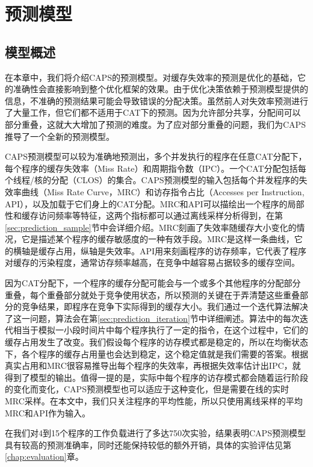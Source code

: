 
\chapter{预测模型} \label{chap:prediction}
\section{模型概述}
在本章中，我们将介绍CAPS的预测模型。对缓存失效率的预测是优化的基础，它的准确性会直接影响到整个优化框架的效果。由于优化决策依赖于预测模型提供的信息，不准确的预测结果可能会导致错误的分配决策。虽然前人对失效率预测进行了大量工作，但它们都不适用于CAT下的预测。因为允许部分共享，分配间可以部分重叠，这就大大增加了预测的难度。为了应对部分重叠的问题，我们为CAPS推导了一个全新的预测模型。

CAPS预测模型可以较为准确地预测出，多个并发执行的程序在任意CAT分配下，每个程序的缓存失效率（Miss Rate）和周期指令数（IPC）。一个CAT分配包括每个线程/核的分配（CLOS）的集合。CAPS预测模型的输入包括每个并发程序的失效率曲线（Miss Rate Curve，MRC）和访存指令占比（Accesses per Instruction, API），以及加载于它们身上的CAT分配。MRC和API可以描绘出一个程序的局部性和缓存访问频率等特征，这两个指标都可以通过离线采样分析得到，在第\ref{sec:prediction_sample}节中会详细介绍。MRC刻画了失效率随缓存大小变化的情况，它是描述某个程序的缓存敏感度的一种有效手段。MRC是这样一条曲线，它的横轴是缓存占用，纵轴是失效率。API用来刻画程序的访存频率，它代表了程序对缓存的污染程度，通常访存频率越高，在竞争中越容易占据较多的缓存空间。

因为CAT分配下，一个程序的缓存分配可能会与一个或多个其他程序的分配部分重叠，每个重叠部分就处于竞争使用状态，所以预测的关键在于弄清楚这些重叠部分的竞争结果，即程序在竞争下实际得到的缓存大小。我们通过一个迭代算法解决了这一问题，算法会在第\ref{sec:prediction_iteration}节中详细阐述。算法中的每次迭代相当于模拟一小段时间片中每个程序执行了一定的指令，在这个过程中，它们的缓存占用发生了改变。我们假设每个程序的访存模式都是稳定的，所以在均衡状态下，各个程序的缓存占用量也会达到稳定，这个稳定值就是我们需要的答案。根据真实占用和MRC很容易推导出每个程序的失效率，再根据失效率估计出IPC，就得到了模型的输出。值得一提的是，实际中每个程序的访存模式都会随着运行阶段的变化而变化，CAPS预测模型也可以适应于这种变化，但是需要在线的实时MRC采样。在本文中，我们只关注程序的平均性能，所以只使用离线采样的平均MRC和API作为输入。

在我们对4到15个程序的工作负载进行了多达750次实验，结果表明CAPS预测模型具有较高的预测准确率，同时还能保持较低的额外开销，具体的实验评估见第\ref{chap:evaluation}章。


